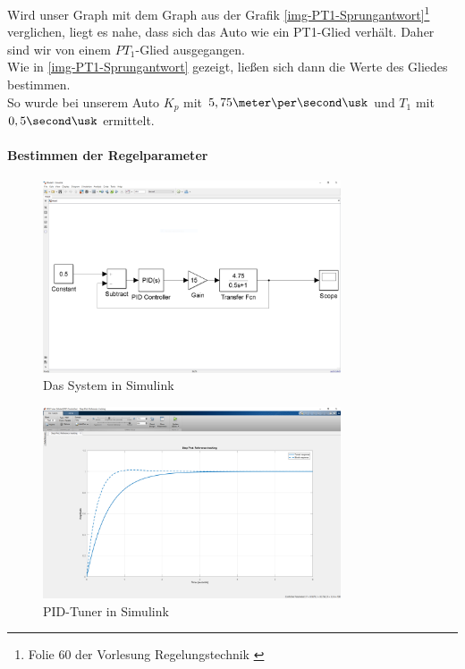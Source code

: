 \documentclass[a4paper,12pt]{report}
\begin{document}
	Wird unser Graph mit dem Graph aus der Grafik \ref{img-PT1-Sprungantwort}\footnote{Folie 60 der Vorlesung Regelungstechnik \cite{Regelungstechnik}} verglichen, liegt es nahe, dass sich das Auto wie ein PT1-Glied verhält. Daher sind wir von einem $PT_1$-Glied ausgegangen. \\
	Wie in \autoref{img-PT1-Sprungantwort} gezeigt, ließen sich dann die Werte des Gliedes bestimmen.\\
	So wurde bei unserem Auto $K_p$ mit $5,75 \meter\per\second\usk$ und $T_1$ mit $0,5\second\usk$ ermittelt.\\

	\paragraph{Bestimmen der Regelparameter}
	\begin{figure}[ht]
		\centering
		\includegraphics[width=250pt,keepaspectratio]{assets/Simulink.PNG}
		\caption{Das System in Simulink}
		\label{img-Simulink}
	\end{figure}

	\begin{figure}[ht]
		\centering
		\includegraphics[width=250pt,keepaspectratio]{assets/PID-Tuner.PNG}
		\caption{PID-Tuner in Simulink}
		\label{img-PID-Tuner}
	\end{figure}
\end{document}
